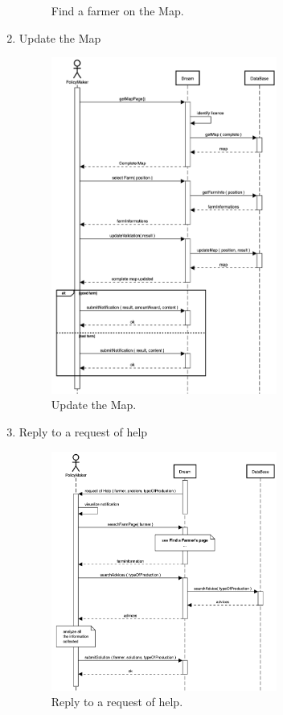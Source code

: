 \begin{enumerate}
\begin{figure}[H]
\begin{center}
        \caption{Find a farmer on the Map.}
        \label{fig:state9}
        \end{center}
    \end{figure}
    \item Update the Map
    \begin{figure}[H]
        \begin{center}
        \includegraphics[width=0.7\textwidth]{sequence/updateMap.png}
        \caption{Update the Map.}
        \label{fig:state9}
        \end{center}
    \end{figure}
    \item Reply to a request of help
    \begin{figure}[H]
        \begin{center}
        \includegraphics[width=0.7\textwidth]{sequence/replyHelp.png}
        \caption{Reply to a request of help.}
        \label{fig:state9}
        \end{center}
    \end{figure}
\end{enumerate}
